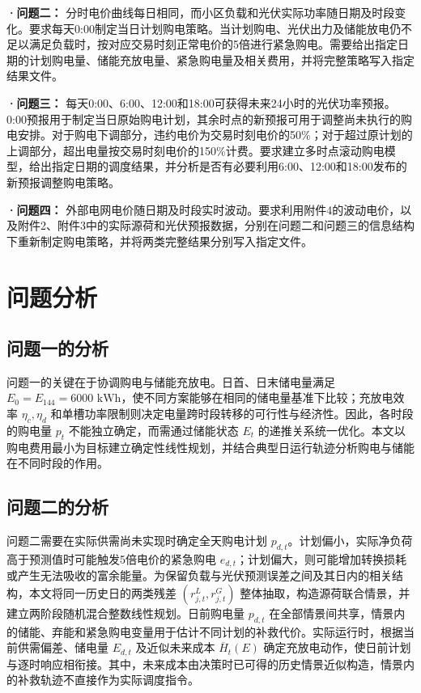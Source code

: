 \documentclass[zihao=-4,a4paper,UTF8,fontset=none]{ctexart}
\begin{document}
\textbf{·问题二：} 分时电价曲线每日相同，而小区负载和光伏实际功率随日期及时段变化。要求每天0:00制定当日计划购电策略。当计划购电、光伏出力及储能放电仍不足以满足负载时，按对应交易时刻正常电价的5倍进行紧急购电。需要给出指定日期的计划购电量、储能充放电量、紧急购电量及相关费用，并将完整策略写入指定结果文件。

\textbf{·问题三：} 每天0:00、6:00、12:00和18:00可获得未来24小时的光伏功率预报。0:00预报用于制定当日原始购电计划，其余时点的新预报可用于调整尚未执行的购电安排。对于购电下调部分，违约电价为交易时刻电价的50\%；对于超过原计划的上调部分，超出电量按交易时刻电价的150\%计费。要求建立多时点滚动购电模型，给出指定日期的调度结果，并分析是否有必要利用6:00、12:00和18:00发布的新预报调整购电策略。

\textbf{·问题四：} 外部电网电价随日期及时段实时波动。要求利用附件4的波动电价，以及附件2、附件3中的实际源荷和光伏预报数据，分别在问题二和问题三的信息结构下重新制定购电策略，并将两类完整结果分别写入指定文件。

\section{问题分析}\label{ux95eeux9898ux5206ux6790}

\subsection{问题一的分析}\label{ux95eeux9898ux4e00ux7684ux5206ux6790}

问题一的关键在于协调购电与储能充放电。日首、日末储电量满足 \(E_0=E_{144}=6000\text{ kWh}\)，使不同方案能够在相同的储电量基准下比较；充放电效率 \(\eta_c,\eta_d\) 和单槽功率限制则决定电量跨时段转移的可行性与经济性。因此，各时段的购电量 \(p_t\) 不能独立确定，而需通过储能状态 \(E_t\) 的递推关系统一优化。本文以购电费用最小为目标建立确定性线性规划，并结合典型日运行轨迹分析购电与储能在不同时段的作用。

\subsection{问题二的分析}\label{ux95eeux9898ux4e8cux7684ux5206ux6790}

问题二需要在实际供需尚未实现时确定全天购电计划 \(p_{d,t}\)。计划偏小，实际净负荷高于预测值时可能触发5倍电价的紧急购电 \(e_{d,t}\)；计划偏大，则可能增加转换损耗或产生无法吸收的富余能量。为保留负载与光伏预测误差之间及其日内的相关结构，本文将同一历史日的两类残差 \((r^L_{j,t},r^G_{j,t})\) 整体抽取，构造源荷联合情景，并建立两阶段随机混合整数线性规划。日前购电量 \(p_{d,t}\) 在全部情景间共享，情景内的储能、弃能和紧急购电变量用于估计不同计划的补救代价。实际运行时，根据当前供需偏差、储电量 \(E_{d,t}\) 及近似未来成本 \(\overline H_t(E)\) 确定充放电动作，使日前计划与逐时响应相衔接。其中，未来成本由决策时已可得的历史情景近似构造，情景内的补救轨迹不直接作为实际调度指令。
\end{document}
